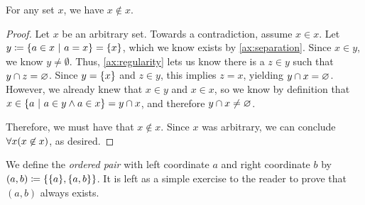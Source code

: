 \begin{theorem}
    For any set \(x\), we have \(x \not \in x\).
\end{theorem}
\begin{proof}
    Let \(x\) be an arbitrary set.
    Towards a contradiction, assume \(x \in x\).
    Let \(y \defn \set*{a \in x \suchthat a = x} = \set*{x}\), which we know exists by \autoref{ax:separation}.
    Since \(x \in y\), we know \(y \neq \emptyset\).
    Thus, \autoref{ax:regularity} lets us know there is a \(z \in y\) such that \(y \cap z = \varnothing\).
    Since \(y = \set*{x}\) and \(z \in y\), this implies \(z = x\), yielding \(y \cap x = \varnothing\).
    However, we already knew that \(x \in y\) and \(x \in x\),
    so we know by definition that \(x \in \set*{a \suchthat a \in y \meet a \in x} = y \intersect x\),
    and therefore \(y \cap x \neq \varnothing\). \contradiction

    Therefore, we must have that \(x \not \in x\).
    Since \(x\) was arbitrary, we can conclude \(\forall x \pn*{x \not \in x}\), as desired.
\end{proof}
% 

\begin{definition}
    We define the \emph{ordered pair} with left coordinate \(a\) and right coordinate \(b\)
    by \((a, b) \defn \set*{\set*{a}, \set*{a, b}}\).
    It is left as a simple exercise to the reader to prove that \((a, b)\) always exists.
\end{definition}

